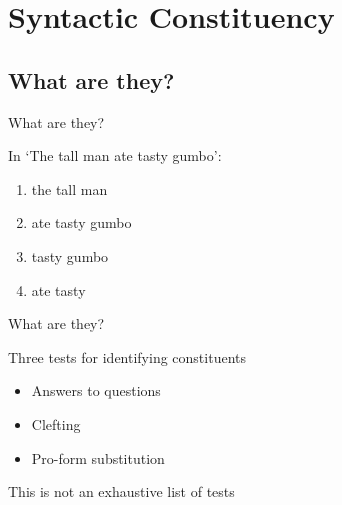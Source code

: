 \documentclass{beamer}
\subtitle[Syntactic Constituency]{Syntactic Constituency}
\newcommand{\suboneone}{What are they?}
\begin{document}
  

  \section{Syntactic Constituency}
    \subsection{\suboneone}
      \begin{frame}[t]{\suboneone}
        \begin{example}
          In `The tall man ate tasty gumbo':
          \begin{enumerate}
            \item the tall man
            \item ate tasty gumbo
            \item tasty gumbo
            \item {}ate tasty
          \end{enumerate}
        \end{example}
      \end{frame}

      \begin{frame}{\suboneone}
        \begin{block}{Three tests for identifying constituents}
          \begin{itemize}
            \item Answers to questions
            \item Clefting
            \item Pro-form substitution
          \end{itemize}
        \end{block}
        \begin{alertblock}{}
          This is not an exhaustive list of tests
        \end{alertblock}
      \end{frame}
\end{document}
